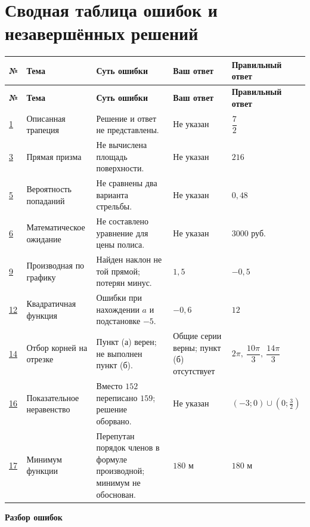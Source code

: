\documentclass[11pt,a4paper]{article}
\begin{document}
\section*{Сводная таблица ошибок и незавершённых решений}
\small
\setlength{\tabcolsep}{3pt}
\begin{longtable}{@{}p{.95cm}p{3.1cm}p{5.3cm}p{2.8cm}p{3.2cm}@{}}
\toprule
\textbf{№} & \textbf{Тема} & \textbf{Суть ошибки} & \textbf{Ваш ответ} & \textbf{Правильный ответ}\\
\midrule
\endfirsthead
\toprule
\textbf{№} & \textbf{Тема} & \textbf{Суть ошибки} & \textbf{Ваш ответ} & \textbf{Правильный ответ}\\
\midrule
\endhead
\hyperref[task:1]{1} & Описанная трапеция & Решение и ответ не представлены. & Не указан & $\dfrac72$\\
\hyperref[task:3]{3} & Прямая призма & Не вычислена площадь поверхности. & Не указан & $216$\\
\hyperref[task:5]{5} & Вероятность попаданий & Не сравнены два варианта стрельбы. & Не указан & $0{,}48$\\
\hyperref[task:6]{6} & Математическое ожидание & Не составлено уравнение для цены полиса. & Не указан & $3000$ руб.\\
\hyperref[task:9]{9} & Производная по графику & Найден наклон не той прямой; потерян минус. & $1{,}5$ & $-0{,}5$\\
\hyperref[task:12]{12} & Квадратичная функция & Ошибки при нахождении $a$ и подстановке $-5$. & $-0{,}6$ & $12$\\
\hyperref[task:14]{14} & Отбор корней на отрезке & Пункт (а) верен; не выполнен пункт (б). & Общие серии верны; пункт (б) отсутствует & $2\pi,\ \dfrac{10\pi}{3},\ \dfrac{14\pi}{3}$\\
\hyperref[task:16]{16} & Показательное неравенство & Вместо $152$ переписано $159$; решение оборвано. & Не указан & $(-3;0)\cup(0;\frac32)$\\
\hyperref[task:17]{17} & Минимум функции & Перепутан порядок членов в формуле производной; минимум не обоснован. & $180$ м & $180$ м\\
\bottomrule
\end{longtable}
\normalsize
\newpage
\thispagestyle{empty}
\vspace*{\fill}
\begin{center}{\Huge\bfseries Разбор ошибок}\end{center}
\vspace*{\fill}
\end{document}
